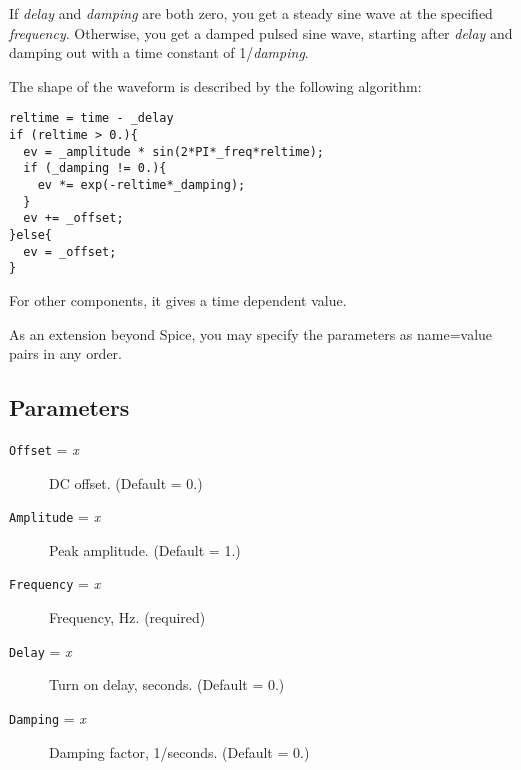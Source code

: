 If {\em delay} and {\em damping} are both zero, you get a steady sine
wave at the specified {\em frequency}.  Otherwise, you get a damped
pulsed sine wave, starting after {\em delay} and damping out with a
time constant of 1/{\em damping}.

The shape of the waveform is described by the following algorithm:

\begin{verbatim}
reltime = time - _delay
if (reltime > 0.){
  ev = _amplitude * sin(2*PI*_freq*reltime);
  if (_damping != 0.){
    ev *= exp(-reltime*_damping);
  }
  ev += _offset;
}else{
  ev = _offset;
}
\end{verbatim}

For other components, it gives a time dependent value.

As an extension beyond Spice, you may specify the parameters as
name=value pairs in any order.
\subsection{Parameters}

\begin{description}

\item[{\tt Offset} = {\it x}] DC offset.  (Default = 0.)

\item[{\tt Amplitude} = {\it x}] Peak amplitude.  (Default = 1.)

\item[{\tt Frequency} = {\it x}] Frequency, Hz.  (required)

\item[{\tt Delay} = {\it x}] Turn on delay, seconds.  (Default = 0.)

\item[{\tt Damping} = {\it x}] Damping factor, 1/seconds.  (Default = 0.)

\end{description}
